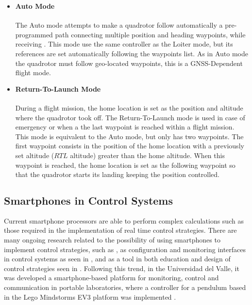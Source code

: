 \begin{itemize}
\item \textbf{Auto Mode}\\\\
The Auto mode attempts to make a quadrotor follow automatically a pre-programmed path connecting multiple position and heading waypoints, while receiving . This mode use the same controller as the Loiter mode, but its references are set automatically following the waypoints list. As in Auto mode the quadrotor must follow geo-located waypoints, this is a GNSS-Dependent flight mode.

\item \textbf{Return-To-Launch Mode}\\\\
During a flight mission, the home location is set as the position and altitude where the quadrotor took off. The Return-To-Launch mode is used in case of emergency or when a the last waypoint is reached within a flight mission. This mode is equivalent to the Auto mode, but only has two waypoints. The first waypoint consists in the position of the home location with a previously set altitude ($RTL$ altitude) greater than the home altitude. When this waypoint is reached, the home location is set as the following waypoint so that the quadrotor starts its landing keeping the position controlled.

\end{itemize}


\subsection{Smartphones in Control Systems}
Current smartphone processors are able to perform complex calculations such as those required in the implementation of real time control strategies. There are many ongoing research related to the possibility of using smartphones to implement control strategies, such as \cite{Drumea2013a}, as configuration and monitoring interfaces in control systems as seen in \cite{Lin2014a,Truong2012a}, and as a tool in both education and design of control strategies seen in \cite{Aristizabal2014a,WuWu2013a}. Following this trend, in the Universidad del Valle, it was developed a smartphone-based platform for monitoring, control and communication in portable laboratories, where a controller for a pendulum based in the Lego Mindstorms EV3 platform was implemented \cite {GarciaTellez2015}.
\\\\
\cite{Gunawan2014}
\cite{Stefka2016}
\cite{Qgurlg2015}
\cite{Luo2014}
\cite{Lu2017}
\cite{Chen2011}
\cite{Tetzlaff2013}
\cite{Geissbuhler2015}
\cite{Oros2013a}
\cite{DeABarbosa2015}

